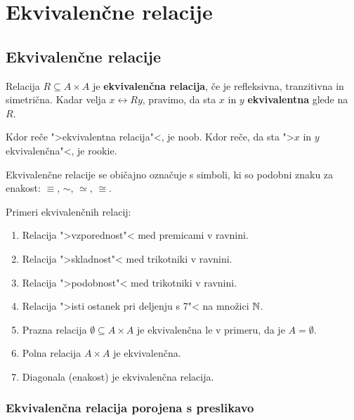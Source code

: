 \chapter{Ekvivalenčne relacije}

\section{Ekvivalenčne relacije}

\begin{definicija}
  Relacija $R \subseteq A \times A$ je \textbf{ekvivalenčna relacija}, če je refleksivna, tranzitivna in simetrična. Kadar velja $x \rel{R} y$, pravimo, da sta $x$ in $y$ \textbf{ekvivalentna} glede na~$R$.
\end{definicija}

\begin{opomba}
  Kdor reče ">ekvivalentna relacija"<, je noob. Kdor reče, da sta ">$x$ in $y$
  ekvivalenčna"<, je rookie.
\end{opomba}

Ekvivalenčne relacije se običajno označuje s simboli, ki so podobni znaku za enakost:
$\equiv$, $\sim$, $\simeq$, $\cong$.

\begin{primer}
  Primeri ekvivalenčnih relacij:
  \begin{enumerate}
    \item Relacija ">vzporednost"< med premicami v ravnini.
    \item Relacija ">skladnost"< med trikotniki v ravnini.
    \item Relacija ">podobnost"< med trikotniki v ravnini.
    \item Relacija ">isti ostanek pri deljenju s 7"< na množici $\mathbb{N}$.
    \item Prazna relacija $\emptyset \subseteq A \times A$ je ekvivalenčna le v primeru, da je $A = \emptyset$.
    \item Polna relacija $A \times A$ je ekvivalenčna.
    \item Diagonala (enakost) je ekvivalenčna relacija.
  \end{enumerate}
\end{primer}

\subsection{Ekvivalenčna relacija porojena s preslikavo}

